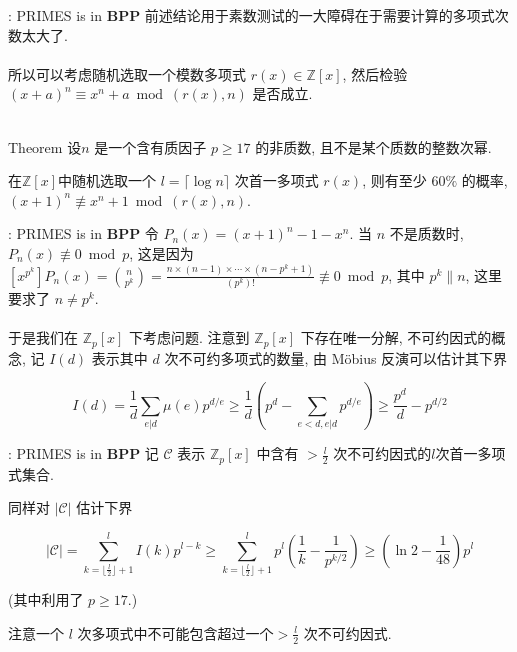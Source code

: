 \documentclass{beamer}
\def\ge{\geqslant}
\begin{document}
\begin{frame}{\cite{AB99}: \textsf{PRIMES} is in \textbf{BPP}}
	前述结论用于素数测试的一大障碍在于需要计算的多项式次数太大了.\\~\\
	
	所以可以考虑随机选取一个模数多项式 $r(x) \in \mathbb Z[x]$, 然后检验$(x + a)^n \equiv x^n + a \bmod (r(x), n)$ 是否成立.\\~\\

	\begin{block}{Theorem}
		设$n$ 是一个含有质因子 $p \ge 17$ 的非质数, 且不是某个质数的整数次幂.
		
		在$\mathbb Z[x]$中随机选取一个 $l = \lceil \log n \rceil$ 次首一多项式 $r(x)$, 则有至少 $60\%$ 的概率, $(x + 1)^n \not\equiv x^n + 1 \bmod (r(x), n)$.
	\end{block}
	
\end{frame}
\begin{frame}{\cite{AB99}: \textsf{PRIMES} is in \textbf{BPP}}
	令 $P_n(x) = (x + 1)^n - 1 - x^n$. 当 $n$ 不是质数时, $P_n(x) \not\equiv 0 \bmod p$, 这是因为$[x^{p^k}] P_n(x) = \binom{n}{p^k} = \frac{n \times (n-1) \times \cdots \times (n-p^k+1)}{(p^k)!} \not\equiv 0 \bmod p$, 其中 $p^k \| n$, 这里要求了 $n \neq p^k$.\\~\\

	于是我们在 $\mathbb Z_p[x]$ 下考虑问题. 注意到 $\mathbb Z_p[x]$ 下存在唯一分解, 不可约因式的概念, 记 $I(d)$ 表示其中 $d$ 次不可约多项式的数量, 由 M\"obius 反演可以估计其下界

	$$ I(d) = \frac{1}{d}\sum_{e | d}\mu(e)p^{d/e} \ge \frac{1}{d}\left( p^d -  \sum_{e < d, e | d}p^{d/e}\right) \ge \frac{p^d}{d} - p^{d/2} $$
\end{frame}
\begin{frame}{\cite{AB99}: \textsf{PRIMES} is in \textbf{BPP}}
	记 $\mathcal C$ 表示 $\mathbb Z_p[x]$ 中含有 $> \frac{l}{2}$ 次不可约因式的$l$次首一多项式集合. 
	
	同样对 $|\mathcal C|$ 估计下界

	$$|\mathcal C| = \sum_{k = \lfloor \frac l2 \rfloor + 1}^{l}I(k)p^{l-k} \ge \sum_{k = \lfloor \frac l2 \rfloor + 1}^{l}p^l\left(\frac 1k - \frac{1}{p^{k/2}}\right) \ge \left(\ln 2 - \frac{1}{48}\right)p^l$$

	(其中利用了 $p \ge 17$.)

	注意一个 $l$ 次多项式中不可能包含超过一个$> \frac{l}{2}$ 次不可约因式.
\end{frame}
\end{document}
